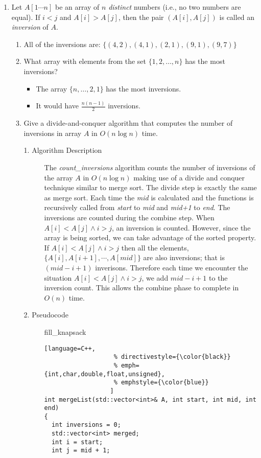 \documentclass[11pt]{article}
\begin{document}
\begin{enumerate}
\item %
Let $A[1\cdots n]$ be an array of $n$ {\em distinct} numbers (i.e., no two
numbers are equal). If $i<j$ and $A[i]>A[j]$, then the pair
$(A[i],A[j])$ is called an {\em inversion} of $A$.

\begin{enumerate}
\item %
  All of the inversions are: $\{(4,2),(4,1),(2,1),(9,1),(9,7)\}$

\item %
  What array with elements from the set $\{1,2,\ldots,n\}$ has the most inversions?
  \begin{itemize}
    \item The array $\{n,\ldots,2,1\}$ has the most inversions.
    \item It would have $\frac{n(n-1)}{2}$ inversions.
  \end{itemize}

\item %
  Give a divide-and-conquer algorithm that computes the number of
  inversions in array $A$ in $O(n\log n)$ time.
\begin{description}
\item[1. Algorithm Description]

  The \textit{count\_inversions} algorithm counts the number of inversions of the array $A$ in $O(n\log{n})$ making use of a divide and conquer technique similar to merge sort. The divide step is exactly the same as merge sort. Each time the \textit{mid} is calculated and the functions is recursively called from \textit{start} to \textit{mid} and \textit{mid+1} to \textit{end}. The inversions are counted during the combine step. When $A[i] < A[j] \wedge i > j$, an inversion is counted. However, since the array is being sorted, we can take advantage of the sorted property. If $A[i] < A[j] \wedge i > j$ then all the elements, $\{A[i], A[i+1], \cdots, A[mid]\}$ are also inversions; that is $(mid - i + 1)$ inverisons. Therefore each time we encounter the situation $A[i] < A[j] \wedge i > j$, we add $mid - i + 1$ to the inversion count. This allows the combine phase to complete in $O(n)$ time.


\item[2. Pseudocode]
fill\_knapsack

\begin{lstlisting}[language=C++,
                   % directivestyle={\color{black}}
                   % emph={int,char,double,float,unsigned},
                   % emphstyle={\color{blue}}
                  ]
int mergeList(std::vector<int>& A, int start, int mid, int end)
{
  int inversions = 0;
  std::vector<int> merged;
  int i = start;
  int j = mid + 1;


\end{lstlisting}
\end{description}
\end{enumerate}
\end{enumerate}
\end{document}

